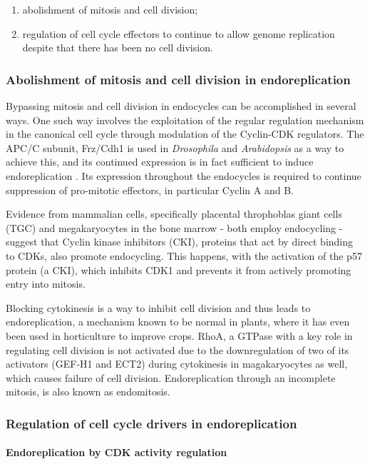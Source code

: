 \documentclass[11pt,twoside,a4paper]{report}
\begin{document}
			\begin{enumerate}
				\item abolishment of mitosis and cell division;
				\item regulation of cell cycle effectors to continue to allow genome replication despite that there has been no cell division.
			\end{enumerate}
						
				\subsubsection{Abolishment of mitosis and cell division in endoreplication}
				Bypassing mitosis and cell division in endocycles can be accomplished in several ways. One such way involves the exploitation of the regular regulation mechanism in the canonical cell cycle through modulation of the Cyclin-CDK regulators. 
				The APC/C subunit, Frz/Cdh1 is used in \textit{Drosophila} and \textit{Arabidopsis} as a way to achieve this, and its continued expression is in fact sufficient to induce endoreplication \cite{asd}. Its expression throughout the endocycles is required to continue suppression of pro-mitotic effectors, in particular Cyclin A and B.
				
				Evidence from mammalian cells, specifically placental throphoblas giant cells (TGC) and megakaryocytes in the bone marrow - both employ endocycling - suggest that Cyclin kinase inhibitors (CKI), proteins that act by direct binding to CDKs, also promote endocycling. This happens, with the activation of the p57 protein (a CKI), which inhibits CDK1 and prevents it from actively promoting entry into mitosis.	
				
			 	Blocking cytokinesis is a way to inhibit cell division and thus leads to endoreplication, a mechanism known to be normal in plants, where it has even been used in horticulture to improve crops. RhoA, a GTPase with a key role in regulating cell division is not activated due to the downregulation of two of its activators (GEF-H1 and ECT2) during cytokinesis in magakaryocytes as well, which causes failure of cell division. Endoreplication through an incomplete mitosis, is also known as endomitosis.
			
			\subsubsection{Regulation of cell cycle drivers in endoreplication}
			
				\paragraph{Endoreplication by CDK activity regulation}
			
\end{document}

